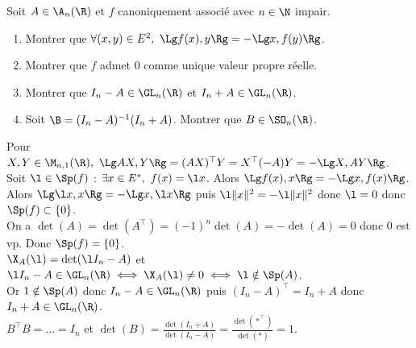 \documentclass[11pt]{article}
\begin{document}
\begin{exercice}{}{}
    Soit $A\in\A_n(\R)$ et $f$ canoniquement associé avec $n\in\N$ impair.
    \begin{enumerate}
        \item Montrer que $\forall (x,y) \in E^2, ~ \Lg f(x),y\Rg = -\Lg x,f(y)\Rg$.
        \item Montrer que $f$ admet 0 comme unique valeur propre réelle.
        \item Montrer que $I_n-A\in\GL_n(\R)$ et $I_n+A\in\GL_n(\R)$.
        \item Soit $\B=(I_n-A)^{-1}(I_n+A)$. Montrer que $B\in\SO_n(\R)$.
    \end{enumerate}
    \tcblower
     Pour $X,Y\in\M_{n,1}(\R), ~ \Lg AX,Y \Rg = (AX)^\top Y = X^\top (-A)Y = -\Lg X,AY \Rg$.\\
     Soit $\l\in\Sp(f)$ : $\exists x \in E^*, ~ f(x) = \l x$. Alors $\Lg f(x),x\Rg = -\Lg x,f(x)\Rg$.\\
    Alors $\Lg \l x, x \Rg = -\Lg x, \l x \Rg$ puis $\l\|x\|^2 = -\l\|x\|^2$ donc $\l=0$ donc $\Sp(f)\subset\{0\}$.\\
    On a $\det(A)=\det(A^\top)=(-1)^n\det(A)=-\det(A)=0$ donc $0$ est vp. Donc $\Sp(f)=\{0\}$.\\
     $\X_A(\l)=\det(\l I_n-A)$ et $\l I_n-A\in\GL_n(\R) \iff \X_A(\l)\neq0 \iff \l \notin \Sp(A)$.\\
    Or $1\notin\Sp(A)$ donc $I_n-A\in\GL_n(\R)$ puis $(I_n-A)^\top=I_n+A$ donc $I_n+A\in\GL_n(\R)$.\\
     $B^\top B=...=I_n$ et $\det(B)=\frac{\det(I_n+A)}{\det(I_n-A)}=\frac{\det(*^\top)}{\det(*)}=1$.
\end{exercice}
\end{document}
